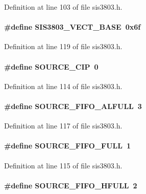 Definition at line 103 of file sis3803.h.
\paragraph[{SIS3803\_\-VECT\_\-BASE}]{\setlength{\rightskip}{0pt plus 5cm}\#define SIS3803\_\-VECT\_\-BASE~0x6f}\hfill\label{sis3803_8h_a519a1f2fb3d024515085c7e55ace5d02}


Definition at line 119 of file sis3803.h.
\paragraph[{SOURCE\_\-CIP}]{\setlength{\rightskip}{0pt plus 5cm}\#define SOURCE\_\-CIP~0}\hfill\label{sis3803_8h_ad99fe0fe6a19f9e604fda19863343692}


Definition at line 114 of file sis3803.h.
\paragraph[{SOURCE\_\-FIFO\_\-ALFULL}]{\setlength{\rightskip}{0pt plus 5cm}\#define SOURCE\_\-FIFO\_\-ALFULL~3}\hfill\label{sis3803_8h_a1c4f9aa514c4e359578a0a3c471e0e44}


Definition at line 117 of file sis3803.h.
\paragraph[{SOURCE\_\-FIFO\_\-FULL}]{\setlength{\rightskip}{0pt plus 5cm}\#define SOURCE\_\-FIFO\_\-FULL~1}\hfill\label{sis3803_8h_a9bd02e07df6be2dcc75f77654c3b369b}


Definition at line 115 of file sis3803.h.
\paragraph[{SOURCE\_\-FIFO\_\-HFULL}]{\setlength{\rightskip}{0pt plus 5cm}\#define SOURCE\_\-FIFO\_\-HFULL~2}\hfill\label{sis3803_8h_acba7195ba8f939f64574d456d52c5589}


